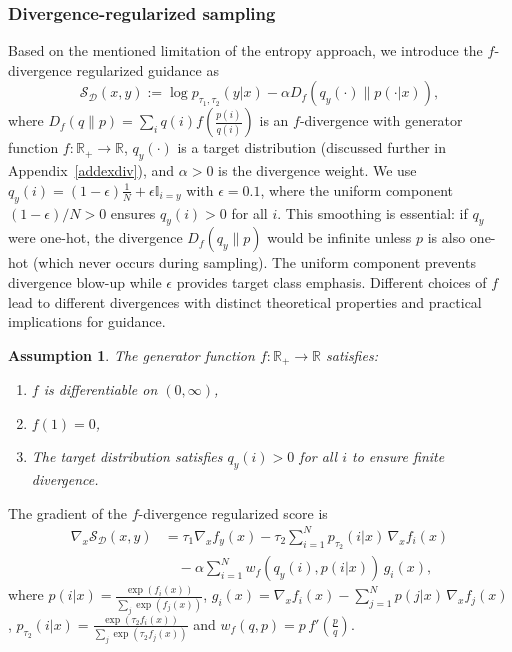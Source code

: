 \documentclass{article}
\newtheorem{assumption}{Assumption}
\begin{document}
\subsubsection{Divergence-regularized sampling}
Based on the mentioned limitation of the entropy approach, we introduce the $f$-divergence regularized guidance as 
\begin{equation}
    \mathcal{S}_{\mathcal{D}}(x, y) := \log p_{\tau_1,\tau_2}(y|x) - \alpha D_{f}(q_y(\cdot) \| p(\cdot|x)),
\label{eq:f_divergence_general}
\end{equation}
where $D_f(q \| p) = \sum_i q(i) f\left(\frac{p(i)}{q(i)}\right)$ is an $f$-divergence with generator function $f: \mathbb{R}_+ \to \mathbb{R}$, $q_y(\cdot)$ is a target distribution (discussed further in Appendix~\ref{addexdiv}), and $\alpha > 0$ is the divergence weight. We use $q_y(i) = (1-\epsilon)\frac{1}{N} + \epsilon\mathbb{I}_{i=y}$ with $\epsilon=0.1$, where the uniform component $(1-\epsilon)/N > 0$ ensures $q_y(i) > 0$ for all $i$. This smoothing is essential: if $q_y$ were one-hot, the divergence $D_f(q_y\|p)$ would be infinite unless $p$ is also one-hot (which never occurs during sampling). The uniform component prevents divergence blow-up while $\epsilon$ provides target class emphasis. Different choices of $f$ lead to different divergences with distinct theoretical properties and practical implications for guidance.
\begin{assumption}
\label{assump:divergence}
The generator function $f: \mathbb{R}_+ \to \mathbb{R}$ satisfies:
\begin{enumerate}
    \item $f$ is differentiable on $(0,\infty)$,
    \item $f(1) = 0$,
    \item The target distribution satisfies $q_y(i) > 0$ for all $i$ to ensure finite divergence.
\end{enumerate}
\end{assumption}

\begin{proposition}
\label{prop:general_f_div}
The gradient of the $f$-divergence regularized score is
\begin{align}
\nabla_x \mathcal{S}_{\mathcal{D}}(x,y)
&= \tau_1 \nabla_x f_y(x)
 - \tau_2 \!\sum_{i=1}^N p_{\tau_2}(i|x)\,\nabla_x f_i(x) \nonumber\\
&\quad - \alpha \!\sum_{i=1}^N 
   w_f(q_y(i),p(i|x))\,
   g_i(x),
\label{eq:general_f_gradient}
\end{align}
where $p(i|x) = \frac{\exp(f_i(x))}{\sum_j \exp(f_j(x))}$,
$g_i(x)= \nabla_x f_i(x) - \sum_{j=1}^N p(j|x)\,\nabla_x f_j(x)$, $p_{\tau_2}(i|x) = \frac{\exp(\tau_2f_i(x))}{\sum_j \exp(\tau_2f_j(x))}$  and 
$w_f(q,p)=p\,f'\!\left(\frac{p}{q}\right)$.
\end{proposition}
\end{document}
